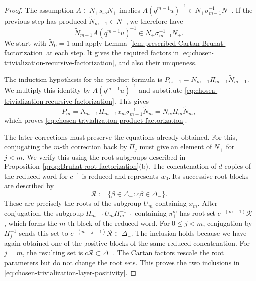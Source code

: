 \documentclass[11pt,leqno]{amsart}
\numberwithin{equation}{section}
\theoremstyle{plain}
\theoremstyle{definition}
\theoremstyle{plain}
\theoremstyle{definition}
\theoremstyle{remark}
\begin{document}
\begin{proof}
The assumption $A\in N_+s_{\mathrm{as}}N_+$ implies $A(q^{m-1}u)^{-1}\in N_+\sigma_{m-1}^{-1}N_+$.  If the previous step has produced $\widetilde N_{m-1}\in N_+$, we therefore have
\[
 \widetilde N_{m-1}A(q^{m-1}u)^{-1}
 \in N_+\sigma_{m-1}^{-1}N_+.
\]
We start with $\widetilde N_0=1$ and apply Lemma~\ref{lem:prescribed-Cartan-Bruhat-factorization} at each step.  It gives the required factors in \eqref{eq:chosen-trivialization-recursive-factorization}, and also their uniqueness.

The induction hypothesis for the product formula is $P_{m-1}=N_{m-1}\Pi_{m-1}\widetilde N_{m-1}$.  We multiply this identity by $A(q^{m-1}u)^{-1}$ and substitute \eqref{eq:chosen-trivialization-recursive-factorization}.  This gives
\[
 P_m
 =N_{m-1}\Pi_{m-1}x_m\sigma_{m-1}^{-1}\widetilde N_m
 =N_m\Pi_m\widetilde N_m,
\]
which proves \eqref{eq:chosen-trivialization-product-factorization}.

The later corrections must preserve the equations already obtained.  For this, conjugating the $m$-th correction back by $\Pi_j$ must give an element of $N_+$ for $j<m$.  We verify this using the root subgroups described in Proposition~\ref{prop:Bruhat-root-factorization}(b).  The concatenation
of $d$ copies of the reduced word for $c^{-1}$ is reduced and represents
$w_0$.  Its successive root blocks are described by
\[
 \mathcal R:=\{\beta\in\Delta_+:c\beta\in\Delta_-\}.
\]
These are precisely the roots of the subgroup $U_m$ containing $x_m$.  After conjugation, the subgroup $\Pi_{m-1}U_m\Pi_{m-1}^{-1}$ containing $n_+^m$ has root set $c^{-(m-1)}\mathcal R$, which forms the $m$-th block of the reduced word.  For $0\le j<m$, conjugation by
$\Pi_j^{-1}$ sends this set to $c^{-(m-j-1)}\mathcal R\subset\Delta_+$.
The inclusion holds because we have again obtained one of the positive
blocks of the same reduced concatenation.  For $j=m$, the resulting set
is $c\mathcal R\subset\Delta_-$.  The Cartan factors rescale the root
parameters but do not change the root sets.  This proves the two inclusions in \eqref{eq:chosen-trivialization-layer-positivity}.


\end{proof}
\end{document}
